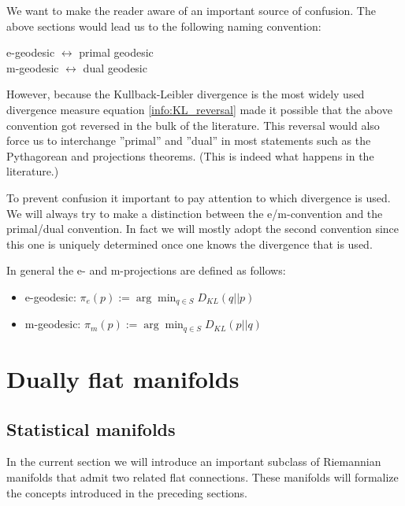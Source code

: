     \begin{remark}
        We want to make the reader aware of an important source of confusion. The above sections would lead us to the following naming convention:
        \begin{center}
            e-geodesic $\leftrightarrow$ primal geodesic\\
            m-geodesic $\leftrightarrow$ dual geodesic
        \end{center}
        However, because the Kullback-Leibler divergence is the most widely used divergence measure equation \ref{info:KL_reversal} made it possible that the above convention got reversed in the bulk of the literature. This reversal would also force us to interchange ''primal'' and ''dual'' in most statements such as the Pythagorean and projections theorems. (This is indeed what happens in the literature.)

        To prevent confusion it important to pay attention to which divergence is used. We will always try to make a distinction between the e/m-convention and the primal/dual convention. In fact we will mostly adopt the second convention since this one is uniquely determined once one knows the divergence that is used.

        In general the e- and m-projections are defined as follows:
        \begin{itemize}
            \item e-geodesic: $\pi_e(p) := \arg\min_{q\in S} D_{KL}(q||p)$
            \item m-geodesic: $\pi_m(p) := \arg\min_{q\in S} D_{KL}(p||q)$
        \end{itemize}
    \end{remark}

\section{Dually flat manifolds}
\subsection{Statistical manifolds}

    In the current section we will introduce an important subclass of Riemannian manifolds that admit two related flat connections. These manifolds will formalize the concepts introduced in the preceding sections.

